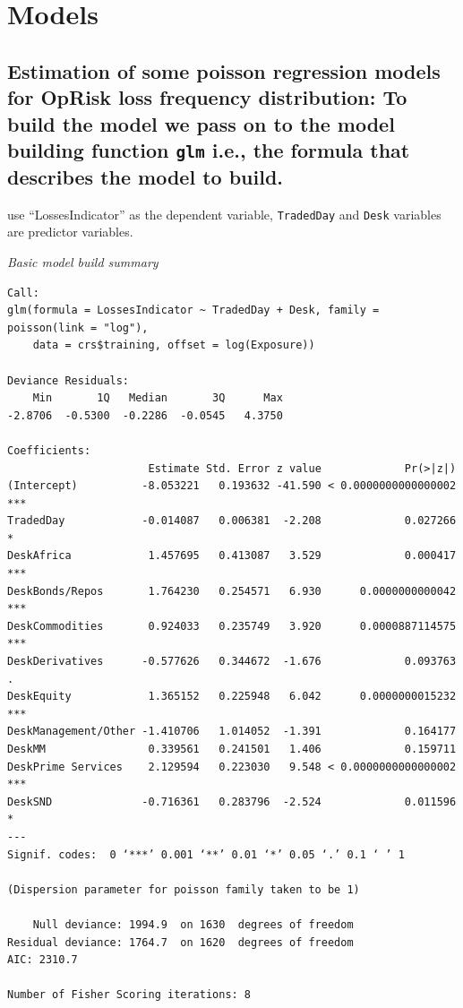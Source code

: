 \documentclass{DissertateUSU}
\begin{document}
\normalsize

\doublespacing

\section{Models}
\label{sec:Models}

\singlespace

\subsection{Estimation of some poisson regression models for OpRisk loss frequency distribution: To build the model we pass on to the model building function \texttt{glm} i.e., the formula that describes the model to build.}
\label{ssec:Estimation of some poisson regression models for OpRisk loss frequency distribution}

use ``LossesIndicator'' as the dependent variable, \texttt{TradedDay}
and \texttt{Desk} variables are predictor variables.

\small

\normalsize

\emph{Basic model build summary}

\begin{verbatim}
Call:
glm(formula = LossesIndicator ~ TradedDay + Desk, family = poisson(link = "log"), 
    data = crs$training, offset = log(Exposure))

Deviance Residuals: 
    Min       1Q   Median       3Q      Max  
-2.8706  -0.5300  -0.2286  -0.0545   4.3750  

Coefficients:
                      Estimate Std. Error z value             Pr(>|z|)    
(Intercept)          -8.053221   0.193632 -41.590 < 0.0000000000000002 ***
TradedDay            -0.014087   0.006381  -2.208             0.027266 *  
DeskAfrica            1.457695   0.413087   3.529             0.000417 ***
DeskBonds/Repos       1.764230   0.254571   6.930      0.0000000000042 ***
DeskCommodities       0.924033   0.235749   3.920      0.0000887114575 ***
DeskDerivatives      -0.577626   0.344672  -1.676             0.093763 .  
DeskEquity            1.365152   0.225948   6.042      0.0000000015232 ***
DeskManagement/Other -1.410706   1.014052  -1.391             0.164177    
DeskMM                0.339561   0.241501   1.406             0.159711    
DeskPrime Services    2.129594   0.223030   9.548 < 0.0000000000000002 ***
DeskSND              -0.716361   0.283796  -2.524             0.011596 *  
---
Signif. codes:  0 ‘***’ 0.001 ‘**’ 0.01 ‘*’ 0.05 ‘.’ 0.1 ‘ ’ 1

(Dispersion parameter for poisson family taken to be 1)

    Null deviance: 1994.9  on 1630  degrees of freedom
Residual deviance: 1764.7  on 1620  degrees of freedom
AIC: 2310.7

Number of Fisher Scoring iterations: 8
\end{verbatim}
\end{document}
